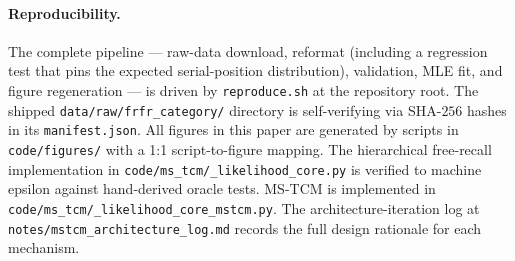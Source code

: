 \documentclass[10pt]{article}
\begin{document}
\paragraph{Reproducibility.}
The complete pipeline --- raw-data download, reformat (including a
regression test that pins the expected serial-position distribution),
validation, MLE fit, and figure regeneration --- is driven by
\texttt{reproduce.sh} at the repository root. The shipped
\texttt{data/raw/frfr\_category/} directory is self-verifying via
SHA-$256$ hashes in its \texttt{manifest.json}. All figures in this
paper are generated by scripts in \texttt{code/figures/} with a 1:1
script-to-figure mapping. The \citet{CornellZhang2025} hierarchical
free-recall implementation in
\texttt{code/ms\_tcm/\_likelihood\_core.py} is verified to machine
epsilon against hand-derived oracle tests. MS-TCM is implemented in
\texttt{code/ms\_tcm/\_likelihood\_core\_mstcm.py}. The
architecture-iteration log at
\texttt{notes/mstcm\_architecture\_log.md} records the full design
rationale for each mechanism.



\end{document}

